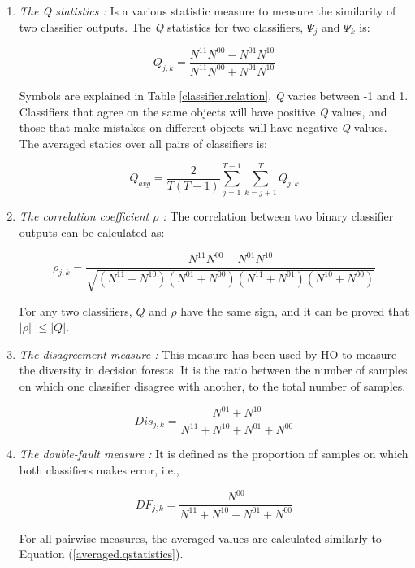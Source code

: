 \begin{enumerate}
    \item \textit{The Q statistics :} Is a various statistic measure to measure the similarity of two classifier outputs. The \textit{Q} statistics for two classifiers, $\Psi_j$ and $\Psi_{k}$ is: 

\begin{equation}
\label{Q.statistics}
 Q_{j,k}=\frac{N^{11}N^{00}-N^{01}N^{10}}{N^{11}N^{00}+N^{01}N^{10}}
\end{equation}

Symbols are explained in Table \ref{classifier.relation}. \textit{Q} varies between -1 and 1. Classifiers that agree on the same objects will have positive \textit{Q} values, and those that make mistakes on different objects will have negative \textit{Q} values. The averaged statics over all pairs of classifiers is:


\begin{equation}
\label{averaged.qstatistics}
Q_{avg}=\frac{2}{T(T-1)} \mathop{\sum}\limits_{j=1}^{T-1} \mathop{\sum}\limits_{k=j+1}^T Q_{j,k}   \end{equation}
    
 \item \textit{The correlation coefficient 	$\rho$ :}  
 The correlation between two binary classifier outputs can be calculated as:   
   

\begin{equation}
\label{correlation.cofficient}
 \rho_{j,k}=\frac{N^{11}N^{00}-N^{01}N^{10}}{\sqrt{(N^{11} + N^{10})(N^{01} + N^{00})(N^{11} + N^{01})(N^{10} + N^{00})}}
\end{equation}    
    
For any two classifiers, $Q$ and $\rho$ have the same sign, and it can be proved that $|\rho|$ $\le |Q|$. 
  
  
\item \textit{The disagreement measure :}    
This measure has been used by HO \cite{ho1998} to measure the diversity in decision forests. It is the ratio between the number of samples on which one classifier disagree with another, to the total number of samples.

\begin{equation}
\label{disagreement.metr}
 Dis_{j,k}=\frac{N^{01} + N^{10}}{N^{11}+ N^{10}+N^{01}+N^{00}}
\end{equation}  
    
    
\item \textit{The double-fault measure :}     
It is defined as the proportion of samples on which both classifiers makes error, i.e.,

\begin{equation}
\label{default.measure}
 DF_{j,k}=\frac{N^{00}}{N^{11}+ N^{10}+N^{01}+N^{00}}
\end{equation}  

    
For all pairwise measures, the averaged values are calculated similarly to Equation (\ref{averaged.qstatistics}).       
\end{enumerate}
 
